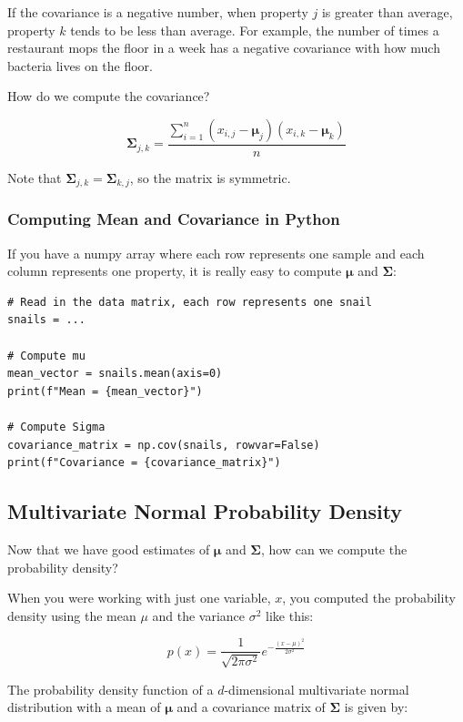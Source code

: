 If the covariance is a negative number, when property $j$ is greater than average, property $k$ tends to be less than average.
For example, the number of times a restaurant mops the floor in a week has a negative covariance with how much bacteria lives on the floor.

How do we compute the covariance?

$$\mathbf{\Sigma}_{j,k} = \frac{\sum_{i=1}^{n}(x_{i,j} - \boldsymbol\mu_j)(x_{i,k} - \boldsymbol\mu_k)}{n}$$

Note that $\mathbf{\Sigma}_{j,k} = \mathbf{\Sigma}_{k,j}$, so the matrix is symmetric.

\subsubsection{Computing Mean and Covariance in Python}

If you have a numpy array where each row represents one sample and each column represents one property, it is really easy to compute $\boldsymbol\mu$ and $\mathbf{\Sigma}$:

\begin{verbatim}
# Read in the data matrix, each row represents one snail
snails = ...

# Compute mu
mean_vector = snails.mean(axis=0)
print(f"Mean = {mean_vector}")

# Compute Sigma
covariance_matrix = np.cov(snails, rowvar=False)
print(f"Covariance = {covariance_matrix}")
\end{verbatim}

\subsection{Multivariate Normal Probability Density}

Now that we have good estimates of $\boldsymbol\mu$ and $\mathbf{\Sigma}$, how can we compute the probability density?

When you were working with just one variable, $x$, you computed the probability density using the mean $\mu$ and the variance $\sigma^2$ like this:

\begin{equation*}
p(x) = \frac{1}{\sqrt{2\pi\sigma^2}} e^{-\frac{(x - \mu)^2}{2\sigma^2}}
\end{equation*}

The probability density function of a $d$-dimensional
multivariate normal distribution with a mean of $\boldsymbol\mu$ and a covariance matrix of $\mathbf{\Sigma}$ is given by:


